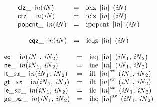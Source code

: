$$
\begin{array}{@{}lcl@{}l@{}}
{{\mathsf{clz}}{\mathsf{\_}}~\,{\mathsf{i}}{{\mathit{n}}}}{({\mathit{iN}})} &=& {\mathrm{iclz}}~\,{|{\mathsf{i}}{{\mathit{n}}}|}~\,({\mathit{iN}}) &  \\
{{\mathsf{ctz}}{\mathsf{\_}}~\,{\mathsf{i}}{{\mathit{n}}}}{({\mathit{iN}})} &=& {\mathrm{iclz}}~\,{|{\mathsf{i}}{{\mathit{n}}}|}~\,({\mathit{iN}}) &  \\
{{\mathsf{popcnt}}{\mathsf{\_}}~\,{\mathsf{i}}{{\mathit{n}}}}{({\mathit{iN}})} &=& {\mathrm{ipopcnt}}~\,{|{\mathsf{i}}{{\mathit{n}}}|}~\,({\mathit{iN}}) &  \\
\end{array}
$$

$$
\begin{array}{@{}lcl@{}l@{}}
{{\mathsf{eqz}}{\mathsf{\_}}~\,{\mathsf{i}}{{\mathit{n}}}}{({\mathit{iN}})} &=& {\mathrm{ieqz}}~\,{|{\mathsf{i}}{{\mathit{n}}}|}~\,({\mathit{iN}}) &  \\
\end{array}
$$

$$
\begin{array}{@{}lcl@{}l@{}}
{{\mathsf{eq}}{\mathsf{\_}}~\,{\mathsf{i}}{{\mathit{n}}}}{({\mathit{iN}}_{{1}},\, {\mathit{iN}}_{{2}})} &=& {\mathrm{ieq}}~\,{|{\mathsf{i}}{{\mathit{n}}}|}~\,({\mathit{iN}}_{{1}},\, {\mathit{iN}}_{{2}}) &  \\
{{\mathsf{ne}}{\mathsf{\_}}~\,{\mathsf{i}}{{\mathit{n}}}}{({\mathit{iN}}_{{1}},\, {\mathit{iN}}_{{2}})} &=& {\mathrm{ine}}~\,{|{\mathsf{i}}{{\mathit{n}}}|}~\,({\mathit{iN}}_{{1}},\, {\mathit{iN}}_{{2}}) &  \\
{{{\mathsf{lt\_}}{{\mathit{sx}}}}{\mathsf{\_}}~\,{\mathsf{i}}{{\mathit{n}}}}{({\mathit{iN}}_{{1}},\, {\mathit{iN}}_{{2}})} &=& {\mathrm{ilt}}~\,{{|{\mathsf{i}}{{\mathit{n}}}|}^{{\mathit{sx}}}}~\,({\mathit{iN}}_{{1}},\, {\mathit{iN}}_{{2}}) &  \\
{{{\mathsf{gt\_}}{{\mathit{sx}}}}{\mathsf{\_}}~\,{\mathsf{i}}{{\mathit{n}}}}{({\mathit{iN}}_{{1}},\, {\mathit{iN}}_{{2}})} &=& {\mathrm{ilt}}~\,{{|{\mathsf{i}}{{\mathit{n}}}|}^{{\mathit{sx}}}}~\,({\mathit{iN}}_{{1}},\, {\mathit{iN}}_{{2}}) &  \\
{{{\mathsf{le\_}}{{\mathit{sx}}}}{\mathsf{\_}}~\,{\mathsf{i}}{{\mathit{n}}}}{({\mathit{iN}}_{{1}},\, {\mathit{iN}}_{{2}})} &=& {\mathrm{ile}}~\,{{|{\mathsf{i}}{{\mathit{n}}}|}^{{\mathit{sx}}}}~\,({\mathit{iN}}_{{1}},\, {\mathit{iN}}_{{2}}) &  \\
{{{\mathsf{ge\_}}{{\mathit{sx}}}}{\mathsf{\_}}~\,{\mathsf{i}}{{\mathit{n}}}}{({\mathit{iN}}_{{1}},\, {\mathit{iN}}_{{2}})} &=& {\mathrm{ihe}}~\,{{|{\mathsf{i}}{{\mathit{n}}}|}^{{\mathit{sx}}}}~\,({\mathit{iN}}_{{1}},\, {\mathit{iN}}_{{2}}) &  \\
\end{array}
$$

